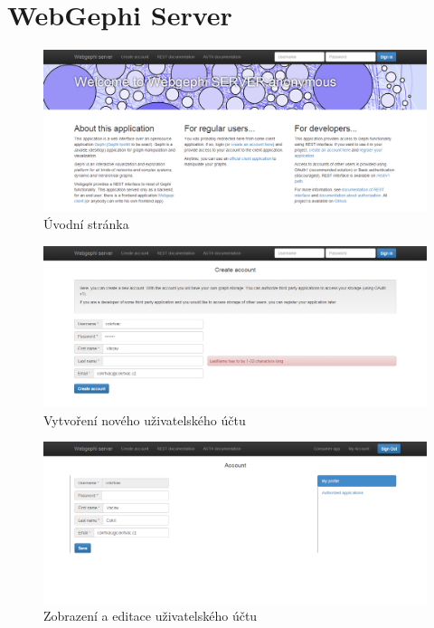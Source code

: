 \documentclass[thesis=M,czech]{FITthesis}[2014/05/6]
\begin{document}
\section{WebGephi Server}
\begin{figure}[!htb]\centering
 	\includegraphics[width=1\textwidth]{images/prtsc/server-01-welcome}
 	\caption[Úvodní stránka]{Úvodní stránka}\label{fig:server-01-welcome}
\end{figure}
\begin{figure}\centering
 	\includegraphics[width=1\textwidth]{images/prtsc/server-02-create_account}
 	\caption[Vytvoření nového uživatelského účtu]{Vytvoření nového uživatelského účtu}\label{fig:server-02-create_account}
\end{figure}
\begin{figure}\centering
 	\includegraphics[width=1\textwidth]{images/prtsc/server-03-user_profile}
 	\caption[Zobrazení a editace uživatelského účtu]{Zobrazení a editace uživatelského účtu}\label{fig:server-03-user_profile}
\end{figure}
\end{document}
